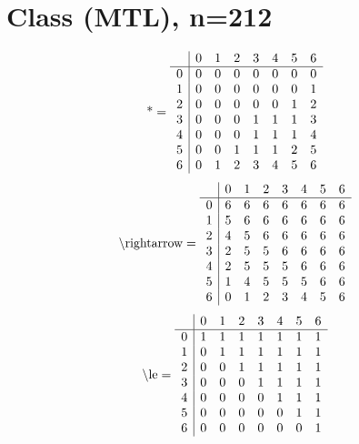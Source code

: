 \documentclass[11pt]{article}
\begin{document}
\section{Class (MTL), n=212}
\[\text{*} = 
\begin{array}{r | r r r r r r r}
 & 0 & 1 & 2 & 3 & 4 & 5 & 6 \\ \hline
0 & 0 & 0 & 0 & 0 & 0 & 0 & 0 \\
1 & 0 & 0 & 0 & 0 & 0 & 0 & 1 \\
2 & 0 & 0 & 0 & 0 & 0 & 1 & 2 \\
3 & 0 & 0 & 0 & 1 & 1 & 1 & 3 \\
4 & 0 & 0 & 0 & 1 & 1 & 1 & 4 \\
5 & 0 & 0 & 1 & 1 & 1 & 2 & 5 \\
6 & 0 & 1 & 2 & 3 & 4 & 5 & 6 \\
\end{array}
\]
\[\text{\textbackslash rightarrow} = 
\begin{array}{r | r r r r r r r}
 & 0 & 1 & 2 & 3 & 4 & 5 & 6 \\ \hline
0 & 6 & 6 & 6 & 6 & 6 & 6 & 6 \\
1 & 5 & 6 & 6 & 6 & 6 & 6 & 6 \\
2 & 4 & 5 & 6 & 6 & 6 & 6 & 6 \\
3 & 2 & 5 & 5 & 6 & 6 & 6 & 6 \\
4 & 2 & 5 & 5 & 5 & 6 & 6 & 6 \\
5 & 1 & 4 & 5 & 5 & 5 & 6 & 6 \\
6 & 0 & 1 & 2 & 3 & 4 & 5 & 6 \\
\end{array}
\]
\[\text{\textbackslash le} = 
\begin{array}{r | r r r r r r r}
 & 0 & 1 & 2 & 3 & 4 & 5 & 6 \\ \hline
0 & 1 & 1 & 1 & 1 & 1 & 1 & 1 \\
1 & 0 & 1 & 1 & 1 & 1 & 1 & 1 \\
2 & 0 & 0 & 1 & 1 & 1 & 1 & 1 \\
3 & 0 & 0 & 0 & 1 & 1 & 1 & 1 \\
4 & 0 & 0 & 0 & 0 & 1 & 1 & 1 \\
5 & 0 & 0 & 0 & 0 & 0 & 1 & 1 \\
6 & 0 & 0 & 0 & 0 & 0 & 0 & 1 \\
\end{array}
\]
\end{document}
